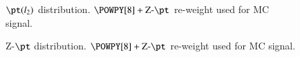 \begin{figure}[h!tbp]
	\centering
	\hfill
	\caption{$\pt(l_2)$ distribution. $\POWPY[8]+\text{Z-}\pt$ re-weight used for MC signal.}
	\label{AFig12P}
\end{figure}

\begin{figure}[h!tbp]
	\centering
	\hfill
	\caption{Z-$\pt$ distribution. $\POWPY[8]+\text{Z-}\pt$ re-weight used for MC signal.}
	\label{AFig13P}
\end{figure}


